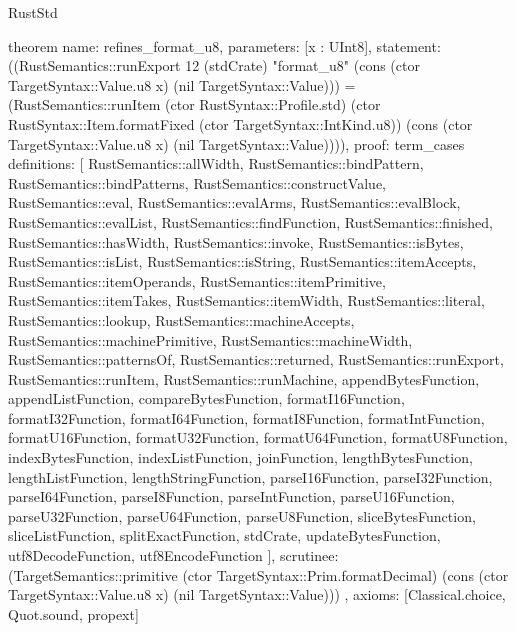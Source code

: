 \begin{lexlean}{RustStd}
\begin{semanticmodule}
theorem{
  name: refines_format_u8,
  parameters: [x : UInt8],
  statement: ((RustSemantics::runExport 12 (stdCrate) "format_u8" (cons (ctor TargetSyntax::Value.u8 x) (nil TargetSyntax::Value))) = (RustSemantics::runItem (ctor RustSyntax::Profile.std) (ctor RustSyntax::Item.formatFixed (ctor TargetSyntax::IntKind.u8)) (cons (ctor TargetSyntax::Value.u8 x) (nil TargetSyntax::Value)))),
  proof: term_cases{
    definitions: [
      RustSemantics::allWidth,
      RustSemantics::bindPattern,
      RustSemantics::bindPatterns,
      RustSemantics::constructValue,
      RustSemantics::eval,
      RustSemantics::evalArms,
      RustSemantics::evalBlock,
      RustSemantics::evalList,
      RustSemantics::findFunction,
      RustSemantics::finished,
      RustSemantics::hasWidth,
      RustSemantics::invoke,
      RustSemantics::isBytes,
      RustSemantics::isList,
      RustSemantics::isString,
      RustSemantics::itemAccepts,
      RustSemantics::itemOperands,
      RustSemantics::itemPrimitive,
      RustSemantics::itemTakes,
      RustSemantics::itemWidth,
      RustSemantics::literal,
      RustSemantics::lookup,
      RustSemantics::machineAccepts,
      RustSemantics::machinePrimitive,
      RustSemantics::machineWidth,
      RustSemantics::patternsOf,
      RustSemantics::returned,
      RustSemantics::runExport,
      RustSemantics::runItem,
      RustSemantics::runMachine,
      appendBytesFunction,
      appendListFunction,
      compareBytesFunction,
      formatI16Function,
      formatI32Function,
      formatI64Function,
      formatI8Function,
      formatIntFunction,
      formatU16Function,
      formatU32Function,
      formatU64Function,
      formatU8Function,
      indexBytesFunction,
      indexListFunction,
      joinFunction,
      lengthBytesFunction,
      lengthListFunction,
      lengthStringFunction,
      parseI16Function,
      parseI32Function,
      parseI64Function,
      parseI8Function,
      parseIntFunction,
      parseU16Function,
      parseU32Function,
      parseU64Function,
      parseU8Function,
      sliceBytesFunction,
      sliceListFunction,
      splitExactFunction,
      stdCrate,
      updateBytesFunction,
      utf8DecodeFunction,
      utf8EncodeFunction
    ],
    scrutinee: (TargetSemantics::primitive (ctor TargetSyntax::Prim.formatDecimal) (cons (ctor TargetSyntax::Value.u8 x) (nil TargetSyntax::Value)))
  },
  axioms: [Classical.choice, Quot.sound, propext]
}


\end{semanticmodule}
\end{lexlean}
